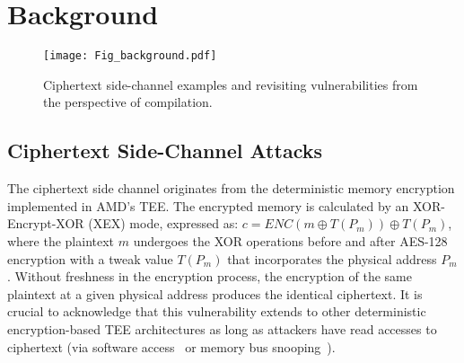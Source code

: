 \section{Background}
\label{sec:background}

\begin{figure*}[htbp]
\centering
\texttt{[image: Fig\_background.pdf]}
\caption{Ciphertext side-channel examples and revisiting vulnerabilities from the perspective of compilation.}
\label{fig:background}
\end{figure*}

\subsection{Ciphertext Side-Channel Attacks}
\label{subsec:ciphertext}

The ciphertext side channel originates from the deterministic memory encryption implemented in AMD's TEE.
The encrypted memory is calculated by an XOR-Encrypt-XOR (XEX) mode, expressed as: $c = ENC(m \oplus T(P_{m})) \oplus T(P_{m})$, where the plaintext $m$ undergoes the XOR operations before and after AES-128 encryption with a tweak value $T(P_{m})$ that incorporates the physical address $P_{m}$.
Without freshness in the encryption process, the encryption of the same plaintext at a given physical address produces the identical ciphertext.
It is crucial to acknowledge that this vulnerability extends to other deterministic encryption-based TEE architectures as long as attackers have read accesses to ciphertext (via software access~\cite{li2021cipherleaks} or memory bus snooping~\cite{lee2020off}).

